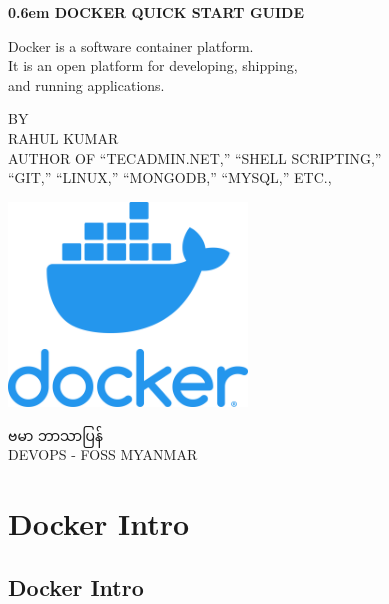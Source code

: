 \documentclass{article}
\begin{document}

\clearpage
\newcommand\nbvspace[1][3]{\vspace*{\stretch{#1}}}
\newcommand\nbstretchyspace{\spaceskip0.5em plus 0.25em minus 0.25em}
\newcommand{\nbtitlestretch}{\spaceskip0.6em}
\pagestyle{empty}
\begin{center}
\bfseries
\nbvspace[1]
\Huge
{\nbtitlestretch\huge
DOCKER QUICK START GUIDE}

\nbvspace[1]
\normalsize

Docker is a software container platform. \\
It is an open platform for developing, shipping, \\
and running applications. 
\nbvspace[1]

\small BY\\
\Large RAHUL KUMAR\\[0.5em]
\footnotesize AUTHOR OF ``TECADMIN.NET,'' ``SHELL SCRIPTING,'' \\
``GIT,'' ``LINUX,'' ``MONGODB,'' ``MYSQL,'' ETC.,

\nbvspace[2]

\includegraphics[width=2.5in]{./docker.png}
\nbvspace[3]
\normalsize

ဗမာ ဘာသာပြန်\\
\large
DEVOPS - FOSS MYANMAR
\nbvspace[1]
\end{center}


\pagebreak

\section{Docker Intro}\label{docker-intro}

\subsection{Docker Intro}\label{docker-intro-1}
\end{document}
